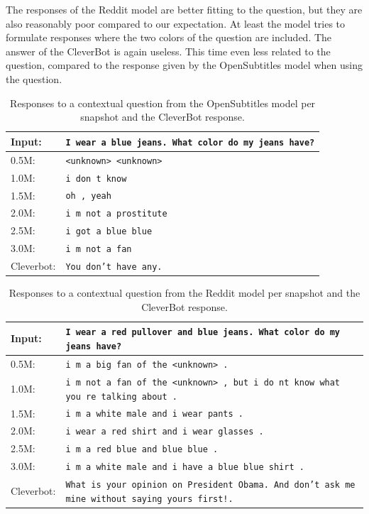 The responses of the Reddit model are better fitting to the question, but they are also reasonably poor compared to our expectation. At least the model tries to formulate responses where the two colors of the question are included. The answer of the CleverBot is again useless. This time even less related to the question, compared to the response given by the OpenSubtitles model when using the question.
\\
\begin{table}[H]
	\centering
	\begin{adjustbox}{max width=\textwidth}
		\begin{tabularx}{\textwidth}{lX}
			\toprule
			Input: 	& \texttt{I wear a blue jeans. What color do my jeans have?}\\
			\midrule
			0.5M: 	& \texttt{<unknown> <unknown>}\\
			1.0M: 	& \texttt{i don t know}\\
			1.5M:	& \texttt{oh , yeah}\\
			2.0M:	& \texttt{i m not a prostitute}\\
			2.5M:	& \texttt{i got a blue blue}\\
			3.0M:	& \texttt{i m not a fan}\\
			Cleverbot:	& \texttt{You don't have any.}\\
			\bottomrule
		\end{tabularx}
	\end{adjustbox}
	\caption{Responses to a contextual question from the OpenSubtitles model per snapshot and the CleverBot response.}
	\label{results:example4_output:OpenSubtitle_compared}
\end{table}
\begin{table}[H]
	\centering
	\begin{adjustbox}{max width=\textwidth}
		\begin{tabularx}{\textwidth}{lX}
			\toprule
			Input: 	& \texttt{I wear a red pullover and blue jeans. What color do my jeans have?}\\
			\midrule
			0.5M: 	& \texttt{i m a big fan of the <unknown> .}\\
			1.0M: 	& \texttt{i m not a fan of the <unknown> , but i do nt know what you re talking about .}\\
			1.5M:	& \texttt{i m a white male and i wear pants .}\\
			2.0M:	& \texttt{i wear a red shirt and i wear glasses .}\\
			2.5M:	& \texttt{i m a red blue and blue blue .}\\
			3.0M:	& \texttt{i m a white male and i have a blue blue shirt .}\\
			Cleverbot:	& \texttt{What is your opinion on President Obama. And don't ask me mine without saying yours first!.}\\
			\bottomrule
		\end{tabularx}
	\end{adjustbox}
	\caption{Responses to a contextual question from the Reddit model per snapshot and the CleverBot response.}
	\label{results:example4_output:Reddit_compared}
\end{table}

